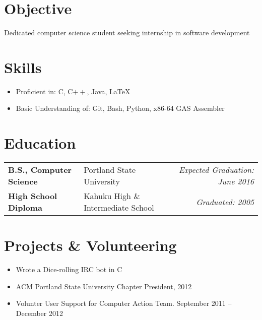 \documentclass[letterpaper,11pt]{article}
\def\objective{Dedicated computer science student seeking internship in software development}
\newcommand{\education}{%
  \begin{tabular}{ llr }
}
\newcommand{\schoolentry}[3]{%
  \textbf{#1} & #2 & \emph{#3} \vspace{3pt} \\
}
\newcommand{\fineducation}{%
  \end{tabular}
}
\begin{document}
\section{Objective} \objective

\section{Skills}
  \begin{itemize}
    \item Proficient in: C, C$++$, Java, \LaTeX
    \item Basic Understanding of: Git, Bash, Python, x86-64 GAS Assembler
  \end{itemize}

\section{Education}
  \education
    \schoolentry{B.S., Computer Science}{Portland State University}{Expected Graduation: June 2016}
    \schoolentry{High School Diploma}{Kahuku High \& Intermediate School}{Graduated: 2005}
  \fineducation

\section{Projects \& Volunteering}
  \begin{itemize}[nosep,label=$\bullet$]
    \item Wrote a Dice-rolling IRC bot in C
    \item ACM Portland State University Chapter President, 2012
    \item Volunter User Support for Computer Action Team. September 2011 -- December 2012
  \end{itemize}
\end{document}
